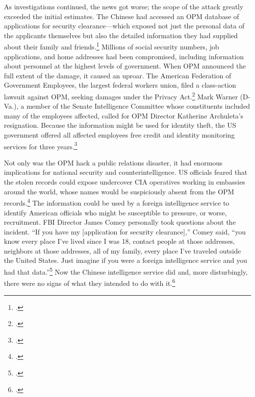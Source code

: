 \documentclass[12pt]{article}
\begin{document}
As investigations continued, the news got worse; the scope of the attack greatly exceeded the initial estimates. The Chinese had accessed an OPM database of applications for security clearance---which exposed not just the personal data of the applicants themselves but also the detailed information they had supplied about their family and friends.\footcite{nakashima_hacks_2015} Millions of social security numbers, job applications, and home addresses had been compromised, including information about personnel at the highest levels of government. When OPM announced the full extent of the damage, it caused an uproar. The American Federation of Government Employees, the largest federal workers union, filed a class-action lawsuit against OPM, seeking damages under the Privacy Act.\footcite[The lawsuits were later dismissed.]{chalfant_court_2017} Mark Warner (D-Va.), a member of the Senate Intelligence Committee whose constituents included many of the employees affected, called for OPM Director Katherine Archuleta's resignation. Because the information might be used for identity theft, the US government offered all affected employees free credit and identity monitoring services for three years.\footcite{nakashima_hacks_2015}

Not only was the OPM hack a public relations disaster, it had enormous implications for national security and counterintelligence. US officials feared that the stolen records could expose undercover CIA operatives working in embassies around the world, whose names would be suspiciously absent from the OPM records.\footcite{nakashima_hacks_2015} The information could be used by a foreign intelligence service to identify American officials who might be susceptible to pressure, or worse, recruitment. FBI Director James Comey personally took questions about the incident. ``If you have my [application for security clearance],'' Comey said, ``you know every place I've lived since I was 18, contact people at those addresses, neighbors at those addresses, all of my family, every place I've traveled outside the United States. Just imagine if you were a foreign intelligence service and you had that data.''\footcite{nakashima_hacks_2015} Now the Chinese intelligence service did and, more disturbingly, there were no signs of what they intended to do with it.\footcite{koerner_inside_2016}
\end{document}
